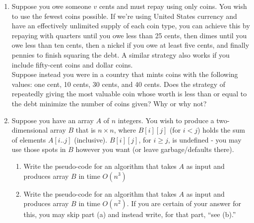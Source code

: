\documentclass{article}
\begin{document}
\begin{enumerate}[label=\Large\textbf{\arabic*}.]
\item Suppose you owe someone $v$ cents and must repay using only coins.  You wish to use the fewest coins possible.  If we're using United States currency and have an effectively unlimited supply of each coin type, you can achieve this by repaying with quarters until you owe less than 25 cents, then dimes until you owe less than ten cents, then a nickel if you owe at least five cents, and finally pennies to finish squaring the debt.  A similar strategy also works if you include fifty-cent coins and dollar coins.\\
Suppose instead you were in a country that mints coins with the following values:  one cent, 10 cents, 30 cents, and 40 cents.   Does the strategy of repeatedly giving the most valuable coin whose worth is less than or equal to the debt minimize the number of coins given?  Why or why not?


\item Suppose you have an array $A$ of $n$ integers.  You wish to produce a two-dimensional array $B$ that is $n \times n$, where $B[i][j]$ (for $i < j$) holds the sum of elements $A[i..j]$ (inclusive).  $B[i][j]$, for $i \geq j$, is undefined - you may use those spots in $B$ however you want (or leave garbage/defaults there).
\begin{enumerate}
	\item Write the pseudo-code for an algorithm that takes $A$ as input and produces array $B$ in time $O(n^3)$
	\item Write the pseudo-code for an algorithm that takes $A$ as input and produces array $B$ in time $O(n^2)$.  If you are certain of your answer for this, you may skip part (a) and instead write, for that part, ``see (b).''
	
\end{enumerate}

\end{enumerate}
\end{document}
